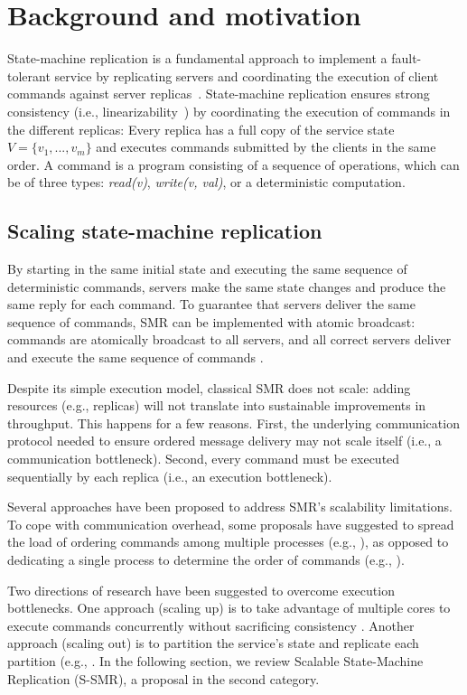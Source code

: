 \section{Background and motivation}
State-machine replication is a fundamental approach to implement a fault-tolerant service by replicating servers and coordinating the execution of client commands against server replicas~\cite{Lam78,Sch90}. 
State-machine replication ensures strong consistency (i.e., linearizability~\cite{Attiya04}) by coordinating the execution of commands in the different replicas: Every replica has a full copy of the service state $V = \{v_1, ..., v_m\}$ and executes commands submitted by the clients in the same order. A command is a program consisting of a sequence of operations, which can be of three types: \emph{read(v)}, \emph{write(v, val)}, or a deterministic computation.

\subsection{Scaling state-machine replication}
By starting in the same initial state and executing the same sequence of deterministic commands, servers make the same state changes and produce the same reply for each command. To guarantee that servers deliver the same sequence of commands, SMR can be implemented with atomic broadcast: commands are atomically broadcast to all servers, and all correct servers deliver and execute the same sequence of commands \cite{BJ87b,DSU04}.

Despite its simple execution model, classical SMR does not scale: adding resources (e.g., replicas) will not translate into sustainable improvements in throughput. This happens for a few reasons. First, the underlying communication protocol needed to ensure ordered message delivery may not scale itself (i.e., a communication bottleneck). Second, every command must be executed sequentially by each replica (i.e., an execution bottleneck).

Several approaches have been proposed to address SMR’s scalability limitations. To cope with communication overhead, some proposals have suggested to spread the load of ordering commands among multiple processes (e.g., \cite{Moraru:2013gw,Mencius,Marandi:2012hb}), as opposed to dedicating a single process to determine the order of commands (e.g., \cite{CT96,Lamport:1998ea}).

Two directions of research have been suggested to overcome execution bottlenecks. One approach (scaling up) is to take advantage of multiple cores to execute commands concurrently without sacrificing consistency \cite{Kapritsos:2012um,Marandi:2014bj,Kotla:2004ep,Guo:2014jp}. Another approach (scaling out) is to partition the service's state and replicate each partition (e.g., \cite{Glendenning:2011kj,Marandi:2011dj}. In the following section, we review Scalable State-Machine Replication (S-SMR), a proposal in the second category.

